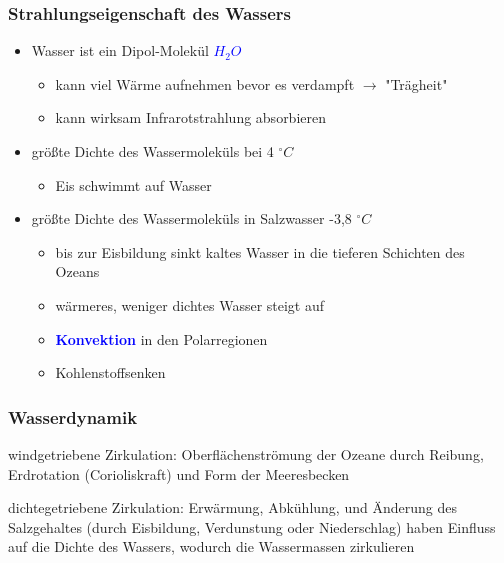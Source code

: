 \begin{frame}
	\frametitle{Strahlungseigenschaft des Wassers} %
	\begin{itemize}
		\item Wasser ist ein Dipol-Molekül \textcolor{blue}{$H_2O$}
		\begin{itemize}			
			\item<2->[$\rightarrow$] kann viel Wärme aufnehmen bevor es verdampft $\rightarrow$ "Trägheit"
			\item<2->[$\rightarrow$] kann wirksam Infrarotstrahlung absorbieren
		\end{itemize}
		
		\item<3-> größte Dichte des Wassermoleküls bei 4 $^{\circ} C$ 
		\begin{itemize}
			\item<4->[$\rightarrow$] Eis schwimmt auf Wasser
		\end{itemize}		
		\item<5-> größte Dichte des Wassermoleküls in Salzwasser -3,8 $^{\circ} C$
		\begin{itemize}
			\item<6->[$\rightarrow$] bis zur Eisbildung sinkt kaltes Wasser in die tieferen Schichten des Ozeans
			\item<6-> [$\rightarrow$] wärmeres, weniger dichtes Wasser steigt auf
			\item<6-> [] \textbf{\textcolor{blue}{Konvektion}} in den Polarregionen 
			\item<6-> [$\rightarrow$] Kohlenstoffsenken
		\end{itemize}
	\end{itemize}


\end{frame}

\begin{frame}
	\frametitle{Wasserdynamik} %
	\begin{block}{windgetriebene Zirkulation: } %
		Oberflächenströmung der Ozeane durch Reibung, Erdrotation (Corioliskraft) und Form der Meeresbecken 
	\end{block}

	\begin{block}{dichtegetriebene Zirkulation: }  %
		Erwärmung, Abkühlung, und Änderung des Salzgehaltes (durch Eisbildung, Verdunstung oder Niederschlag) haben Einfluss auf die Dichte des Wassers, wodurch die Wassermassen zirkulieren
	\end{block}
	
\end{frame}


